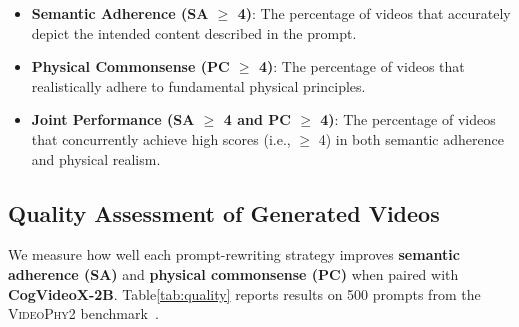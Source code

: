 \begin{itemize}
\item \textbf{Semantic Adherence (SA $\geq$ 4)}: The percentage of videos that accurately depict the intended content described in the prompt.
\item \textbf{Physical Commonsense (PC $\geq$ 4)}: The percentage of videos that realistically adhere to fundamental physical principles.
\item \textbf{Joint Performance (SA $\geq$  4 and PC $\geq$  4)}: The percentage of videos that concurrently achieve high scores (i.e., $\geq$ 4) in both semantic adherence and physical realism.
\end{itemize}

\subsection{Quality Assessment of Generated Videos}
\label{sec:quality}
We measure how well each prompt-rewriting strategy improves \textbf{semantic adherence (SA)} and \textbf{physical commonsense (PC)} when paired with \textbf{CogVideoX-2B}\cite{yang2024cogvideox}.
Table\ref{tab:quality} reports results on 500 prompts from the \textsc{VideoPhy2} benchmark~\cite{bansal2025videophy2}.

